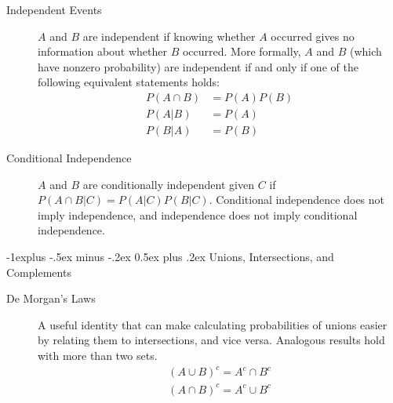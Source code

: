 \documentclass[10pt,landscape]{article}
\makeatletter
\renewcommand{\subsection}{\@startsection{subsection}{2}{0mm}%
                                {-1explus -.5ex minus -.2ex}%
                                {0.5ex plus .2ex}%
                                {\normalfont\normalsize\bfseries}}
\makeatother
\begin{document}
\begin{multicols*}{3}
    \begin{description}
        \item[Independent Events] $A$ and $B$ are independent if knowing whether $A$ occurred gives no information about whether $B$ occurred. More formally, $A$ and $B$ (which have nonzero probability) are independent if and only if one of the following equivalent statements holds: 
           \begin{align*} 
            P({A}\cap { B}) &= P({A})P({B}) \\
            P({ A}|{ B}) &= P({A})\\
            P(B|A) &= P(B)
           \end{align*}
        \item[Conditional Independence]  ${A}$ and ${B}$ are conditionally independent given ${C}$ if $P({A}\cap {B}|{C}) = P({A}|{C})P({B}|{C})$. Conditional independence does not imply independence, and independence does not imply conditional independence.
    \end{description}
    
\subsection{Unions, Intersections, and Complements}

    \begin{description}

        \item[De Morgan's Laws] A useful identity that can make calculating probabilities of unions easier by relating them to intersections, and vice versa. Analogous results hold with more than two sets.
           \begin{align*} 
        ({A} \cup { B})^c = {A^c} \cap { B^c} \\
        ({A} \cap {B})^c = { A^c} \cup { B^c}
           \end{align*} 
                  


\end{description}
\end{multicols*}
\end{document}

